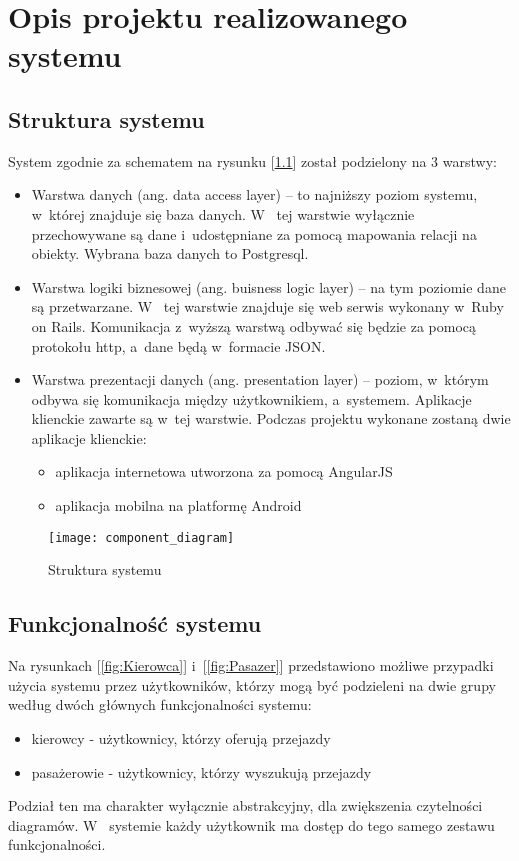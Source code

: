 \documentclass[eng,archivemode]{mgr}
\begin{document}
\chapter{Opis projektu realizowanego systemu}
\section{Struktura systemu}
System zgodnie za schematem na rysunku [\ref{fig:component_diagram}] został podzielony na 3 warstwy:
\begin{itemize}
	\item Warstwa danych (ang. data access layer) -- to najniższy poziom systemu, w~której znajduje się baza danych. W~ tej warstwie wyłącznie przechowywane są dane i~udostępniane za pomocą mapowania relacji na obiekty. Wybrana baza danych to Postgresql.
	\item Warstwa logiki biznesowej (ang. buisness logic layer) -- na tym poziomie dane są przetwarzane. W~ tej warstwie znajduje się web serwis wykonany w~Ruby on Rails. Komunikacja z~wyższą warstwą odbywać się będzie za pomocą protokołu http, a~dane będą w~formacie JSON.
	\item Warstwa prezentacji danych (ang. presentation layer) -- poziom, w~którym odbywa się komunikacja między użytkownikiem, a~systemem. Aplikacje klienckie zawarte są w~tej warstwie. Podczas projektu wykonane zostaną dwie aplikacje klienckie:
	\begin{itemize}
		\item aplikacja internetowa utworzona za pomocą AngularJS
		\item aplikacja mobilna na platformę Android
	\end{itemize}
\end{itemize}
\begin{figure}[H]
	\centering
	\texttt{[image: component\_diagram]}
	\caption{Struktura systemu}
	\label{fig:component_diagram}
\end{figure}

\section{Funkcjonalność systemu}
Na rysunkach [\ref{fig:Kierowca}] i~[\ref{fig:Pasazer}] przedstawiono możliwe przypadki użycia systemu przez użytkowników, którzy mogą być podzieleni na dwie grupy według dwóch głównych funkcjonalności systemu:
	\begin{itemize}
		\item kierowcy - użytkownicy, którzy oferują przejazdy
		\item pasażerowie - użytkownicy, którzy wyszukują przejazdy
	\end{itemize}
Podział ten ma charakter wyłącznie abstrakcyjny, dla zwiększenia czytelności diagramów. W~ systemie każdy użytkownik ma dostęp do tego samego zestawu funkcjonalności.
\end{document}
